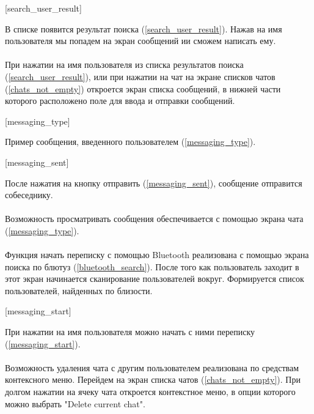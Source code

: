 \documentclass[testmethods]{espd}
\begin{document}
[search_user_result]

В списке появится результат поиска (\ref{search_user_result}). Нажав на имя пользователя мы попадем на экран сообщений ии сможем написать ему.

\paragraph{} %

При нажатии на имя пользователя из списка результатов поиска (\ref{search_user_result}), или при нажатии на чат на экране списков чатов (\ref{chats_not_empty}) откроется экран списка сообщений, в нижней части которого расположено поле для ввода и отправки сообщений.

[messaging_type]

Пример сообщения, введенного пользователем (\ref{messaging_type}).

[messaging_sent]

После нажатия на кнопку отправить (\ref{messaging_sent}), сообщение отправится собеседнику.

\paragraph{} %

Возможность просматривать сообщения обеспечивается с помощью экрана чата (\ref{messaging_type}).

\paragraph{} %

Функция начать переписку с помощью Bluetooth реализована с помощью экрана поиска по блютуз (\ref{bluetooth_search}). После того как пользователь заходит в этот экран начинается сканирование пользователей вокруг. Формируется список пользователей, найденных по близости.

[messaging_start]

При нажатии на имя пользователя можно начать с ними переписку (\ref{messaging_start}).

\paragraph{} %

Возможность удаления чата с другим пользователем реализована по средствам контексного меню. Перейдем на экран списка чатов (\ref{chats_not_empty}). При долгом нажатии на ячеку чата откроется контекстное меню, в опции которого можно выбрать "Delete current chat".
\end{document}
